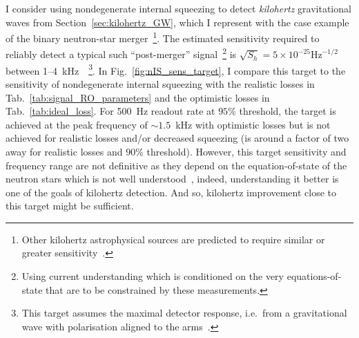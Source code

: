 I consider using nondegenerate internal squeezing to detect \emph{kilohertz} gravitational waves from Section~\ref{sec:kilohertz_GW}, which I represent with the case example of the binary neutron-star merger~\footnote{Other kilohertz astrophysical sources are predicted to require similar or greater sensitivity~\cite{}.}. The estimated sensitivity required to reliably detect a typical such ``post-merger'' signal~\footnote{Using current understanding which is conditioned on the very equations-of-state that are to be constrained by these measurements.} is $\sqrt{S_h}=5\times10^{-25} \mathrm{Hz}^{-1/2}$ between 1--4~kHz~\cite{miaoDesignGravitationalWaveDetectors2018}~\footnote{This target assumes the maximal detector response, i.e.\ from a gravitational wave with polarisation aligned to the arms~\cite{}.}.
In Fig.~\ref{fig:nIS_sens_target}, I compare this target to the sensitivity of nondegenerate internal squeezing with the realistic losses in Tab.~\ref{tab:signal_RO_parameters} and the optimistic losses in Tab.~\ref{tab:ideal_loss}. 
For 500~Hz readout rate at $95\%$ threshold, the target is achieved at the peak frequency of $\sim1.5$~kHz with optimistic losses but is not achieved for realistic losses and/or decreased squeezing (is around a factor of two away for realistic losses and $90\%$ threshold). %
However, this target sensitivity and frequency range are not definitive as they depend on the equation-of-state of the neutron stars which is not well understood~\cite{}, indeed, understanding it better is one of the goals of kilohertz detection. And so, kilohertz improvement close to this target might be sufficient.
